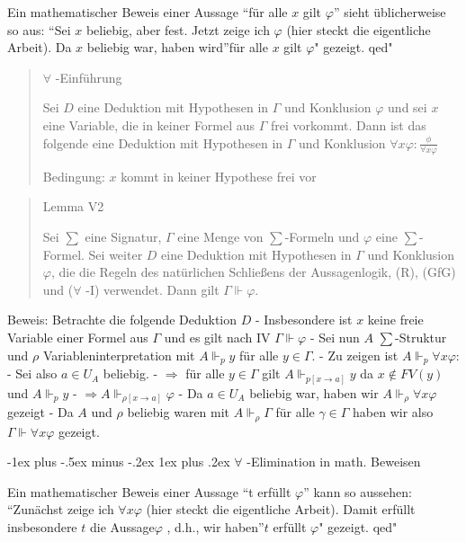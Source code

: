 \documentclass[a4paper]{article}
\makeatletter
\renewcommand{\subsubsection}{\@startsection{subsubsection}{3}{0mm}%
                {-1ex plus -.5ex minus -.2ex}%
                {1ex plus .2ex}%
                {\normalfont\small\bfseries}}
\makeatother
\begin{document}
\begin{multicols}{3}
  Ein mathematischer Beweis einer Aussage ``für alle $x$ gilt $\varphi$''
  sieht üblicherweise so aus: ``Sei $x$ beliebig, aber fest. Jetzt zeige
  ich $\varphi$ (hier steckt die eigentliche Arbeit). Da $x$ beliebig war,
  haben wird''für alle $x$ gilt $\varphi$" gezeigt. qed"

  \begin{quote}
    $\forall$ -Einführung

    Sei $D$ eine Deduktion mit Hypothesen in $\Gamma$ und Konklusion
    $\varphi$ und sei $x$ eine Variable, die in keiner Formel aus $\Gamma$
    frei vorkommt. Dann ist das folgende eine Deduktion mit Hypothesen in
    $\Gamma$ und Konklusion
    $\forall x\varphi: \frac{\phi}{\forall x\varphi}$

    Bedingung: $x$ kommt in keiner Hypothese frei vor
  \end{quote}

  \begin{quote}
    Lemma V2

    Sei $\sum$ eine Signatur, $\Gamma$ eine Menge von $\sum$-Formeln und
    $\varphi$ eine $\sum$-Formel. Sei weiter $D$ eine Deduktion mit
    Hypothesen in $\Gamma$ und Konklusion $\varphi$, die die Regeln des
    natürlichen Schließens der Aussagenlogik, (R), (GfG) und ($\forall$ -I)
    verwendet. Dann gilt $\Gamma\Vdash\varphi$.
  \end{quote}

  Beweis: Betrachte die folgende Deduktion $D$ - Insbesondere ist $x$
  keine freie Variable einer Formel aus $\Gamma$ und es gilt nach IV
  $\Gamma\Vdash\varphi$ - Sei nun $A$ $\sum$-Struktur und $\rho$
  Variableninterpretation mit $A\Vdash_p y$ für alle $y\in\Gamma$. - Zu
  zeigen ist $A\Vdash_p \forall x\varphi$: - Sei also $a\in U_A$ beliebig.
  - $\Rightarrow$ für alle $y\in\Gamma$ gilt
  $A\Vdash_{p[x\rightarrow a]} y$ da $x\not\in FV(y)$ und $A\Vdash_p y$ -
  $\Rightarrow A\Vdash_{\rho[x\rightarrow a]}\varphi$ - Da $a\in U_A$
  beliebig war, haben wir $A\Vdash_\rho\forall x\varphi$ gezeigt - Da $A$
  und $\rho$ beliebig waren mit $A\Vdash_\rho\Gamma$ für alle
  $\gamma\in\Gamma$ haben wir also $\Gamma\Vdash\forall x\varphi$ gezeigt.

  \subsubsection{$\forall$ -Elimination in math.
    Beweisen}\label{forall--elimination-in-math.-beweisen}

  Ein mathematischer Beweis einer Aussage ``t erfüllt $\varphi$'' kann so
  aussehen: ``Zunächst zeige ich $\forall x\varphi$ (hier steckt die
  eigentliche Arbeit). Damit erfüllt insbesondere $t$ die Aussage$\varphi$
  , d.h., wir haben''$t$ erfüllt $\varphi$" gezeigt. qed"


\end{multicols}
\end{document}
